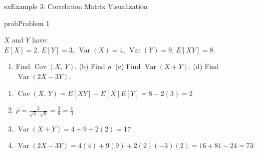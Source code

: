 \begin{PSbox}[unbreakable]{ex}{Example 3: Correlation Matrix Visualization}
\begin{Shaded}
\begin{Highlighting}[]
\OperatorTok{;}
\NormalTok{(}\OperatorTok{,}\OperatorTok{,}\NormalTok{)}\OperatorTok{;} \NormalTok{(}\NormalTok{)}\OperatorTok{;} \OperatorTok{;}
\NormalTok{(}\NormalTok{)}\OperatorTok{;} \NormalTok{(}\NormalTok{)}\OperatorTok{;} \NormalTok{(}\NormalTok{)}\OperatorTok{;}
\NormalTok{(}\OperatorTok{,}\OperatorTok{,}\NormalTok{)}\OperatorTok{;} \NormalTok{(}\NormalTok{)}\OperatorTok{;} \OperatorTok{;}
\NormalTok{(}\NormalTok{)}\OperatorTok{;} \NormalTok{(}\NormalTok{)}\OperatorTok{;} \NormalTok{(}\NormalTok{)}\OperatorTok{;}
\end{Highlighting}
\end{Shaded}

\end{PSbox}


\begin{PSbox}[unbreakable]{prob}{Problem 1}

$X$ and $Y$ have: $E[X] = 2,\, E[Y] = 3,\, \operatorname{Var}(X) = 4,\, \operatorname{Var}(Y) = 9,\, E[XY] = 8$.

\begin{enumerate}
\def\labelenumi{(\alph{enumi})}
\tightlist
\item
  Find $\operatorname{Cov}(X,\,Y)$. (b) Find $\rho$. (c) Find $\operatorname{Var}(X+Y)$. (d) Find $\operatorname{Var}(2X-3Y)$.
\end{enumerate}

\PSsolution{} 

\begin{enumerate}
\def\labelenumi{(\alph{enumi})}
\tightlist
\item
  $\operatorname{Cov}(X,\,Y) = E[XY] - E[X]E[Y] = 8 - 2(3) = 2$
\item
  $\displaystyle \rho = \frac{2}{\sqrt{4} \cdot \sqrt{9}} = \frac{2}{6} = \frac{1}{3}$
\item
  $\operatorname{Var}(X+Y) = 4 + 9 + 2(2) = 17$
\item
  $\operatorname{Var}(2X-3Y) = 4(4) + 9(9) + 2(2)(-3)(2) = 16 + 81 - 24 = 73$
\end{enumerate}

\end{PSbox}

